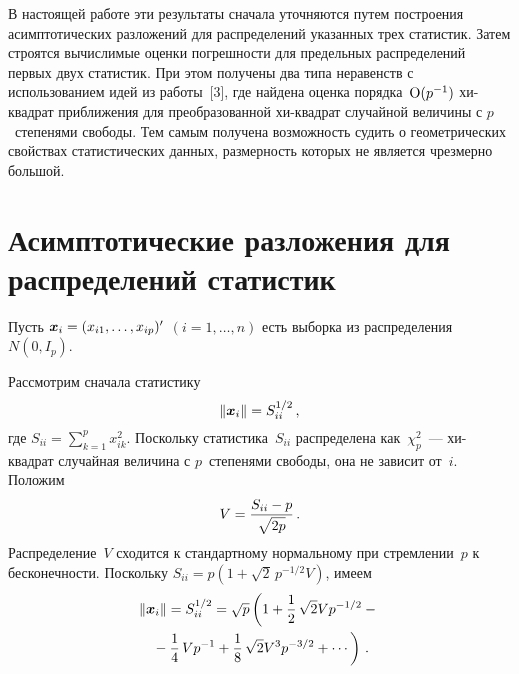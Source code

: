 \begin{multicols}{2}
В настоящей работе  эти результаты сначала уточняются  путем построения асимптотических разложений 
для распределений указанных трех статистик. Затем   строятся вычислимые оценки погрешности для 
предельных распределений первых двух статистик. При этом получены два типа неравенств с использованием 
идей из работы~[3], где найдена оценка порядка~$\mbox{\rm O}(p^{-1})$  хи-квадрат приближения для преобразованной 
хи-квадрат случайной величины с $p$~степенями свободы. Тем самым получена возможность судить о геометрических 
свойствах статистических данных, размерность которых не является чрезмерно большой.


\section{Асимптотические разложения для распределений статистик}

Пусть
$\mbox{\boldmath{$x$}}_i = (x_{i1}, \ldots, x_{ip})^\prime$ $(i =1, \ldots, n)$ есть выборка из распределения~$N(0,I_p)$.

Рассмотрим сначала статистику
$$
\|\mbox{\boldmath{$x$}}_i\|= S_{ii}^{1/2}\,,
$$
где  $S_{ii} = \sum\limits^{p}_{k=1} x^2_{ik}$. Поскольку статистика~$S_{ii}$ распределена как~$\chi_p^{2}$~--- 
хи-квадрат случайная величина с $p$~степенями свободы, она не зависит от~$i$.  Положим
\begin{equation*}
 V = \displaystyle\frac{\displaystyle S_{ii} - p\mathstrut}{\displaystyle \sqrt{2p}\mathstrut}\,.
\end{equation*}
Распределение~$V$ сходится к стандартному нормальному при стремлении~$p$ к бесконечности.
Поскольку  $S_{ii} = p(1 + \sqrt{2}\,p^{-1/2}V)$, имеем
\begin{multline*}
\|\mbox{\boldmath{$x$}}_i\|= S_{ii}^{1/2}
     =\sqrt{p}\left(1 + \displaystyle\frac{\displaystyle 1\mathstrut}{\displaystyle 2\mathstrut}\,\sqrt{2}Vp^{-1/2} -{}\right.\\
\left.     {}- \displaystyle\frac{\displaystyle 1\mathstrut}{\displaystyle 4\mathstrut}\,Vp^{-1} + \displaystyle\frac{\displaystyle 1\mathstrut}{\displaystyle 8\mathstrut}\,\sqrt{2}V^3 p^{-3/2} + \cdots \right)\,.
\end{multline*}


\end{multicols}
